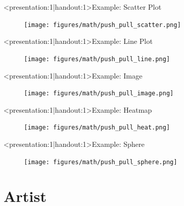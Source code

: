 \documentclass[xcolor={dvipsnames}, handout]{beamer}
\begin{document}
\begin{frame}<presentation:1|handout:1>{Example: Scatter Plot}
    \begin{figure}
        \texttt{[image: figures/math/push\_pull\_scatter.png]}
    \end{figure}
\end{frame}

\begin{frame}<presentation:1|handout:1>{Example: Line Plot}
    \begin{figure}
        \texttt{[image: figures/math/push\_pull\_line.png]}
    \end{figure}
\end{frame}

\begin{frame}<presentation:1|handout:1>{Example: Image}
    \begin{figure}
        \texttt{[image: figures/math/push\_pull\_image.png]}
    \end{figure}
\end{frame}

\begin{frame}<presentation:1|handout:1>{Example: Heatmap}
    \begin{figure}
        \texttt{[image: figures/math/push\_pull\_heat.png]}
    \end{figure}
\end{frame}

\begin{frame}<presentation:1|handout:1>{Example: Sphere}
    \begin{figure}
        \texttt{[image: figures/math/push\_pull\_sphere.png]}
    \end{figure}
\end{frame}


\section{Artist}
\end{document}
